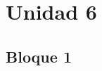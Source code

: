 \documentclass[../Práctica.root.tex]{subfiles}
\begin{document}
\section{Unidad 6}
\subsection{Bloque 1}
\begin{enumerate}

\end{enumerate}
\end{document}
